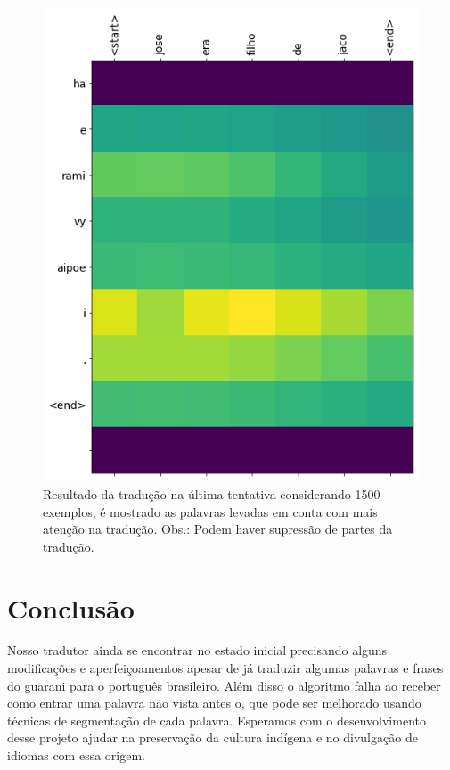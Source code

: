 \documentclass[12pt]{article}
\begin{document}
\begin{figure}[h!]
\centering
\includegraphics[width=.8\textwidth]{graph.png}
\caption{Resultado da tradução na última tentativa considerando 1500 exemplos, é mostrado as palavras levadas em conta com mais atenção na tradução. Obs.: Podem haver supressão de partes da tradução.}
\label{fig:exampleFig1}
\end{figure}



\section{Conclusão}\label{sec:figs}


Nosso tradutor ainda se encontrar no estado inicial precisando alguns modificações e aperfeiçoamentos apesar de já traduzir algumas palavras e frases do guarani para o português brasileiro. Além disso o algoritmo falha ao receber como entrar uma palavra não vista antes o, que pode ser melhorado usando técnicas de segmentação de cada palavra. Esperamos com o desenvolvimento desse projeto ajudar na preservação da cultura indígena e no divulgação de idiomas com essa origem.


\end{document}
